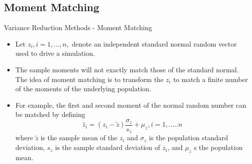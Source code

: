 \documentclass[11pt]{beamer}
\begin{document}
\subsection{Moment Matching}
\begin{frame}{Variance Reduction Methods - Moment Matching}
\begin{itemize}
\item Let  $z_{i}, i=1,...,n,$ denote an independent standard normal random vector
used to drive a simulation. 
\item The sample moments will not exactly match those of the
standard normal. The idea of moment matching is to transform the $ z_{i}$ to
match a finite number of the moments of the underlying population. 
\item For example,
the first and second moment of the normal random number can be matched by
defining
 \begin{equation}
\tilde{z_{i}}=(z_{i}-\tilde{z})\frac{\sigma_{z}}{s_{z}}+\mu_{z}, i=1,.....n
\end{equation}
where $ \tilde{z}$  is the sample mean of the $ z_{i}$ and $\sigma_{z}$ is the
population standard deviation, $ s_{z}$  is the sample standard deviation of $ z_{i}$, and $ \mu_{z}$ s the population mean.
\end{itemize}
\end{frame}
\end{document}
